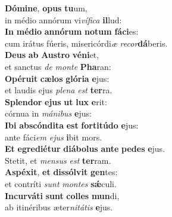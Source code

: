 \evenverse \textbf{Dó}\textbf{mi}\textbf{ne}, \textbf{o}\textbf{pus} \textbf{tu}um,~\*\\
\evenverse in médio annórum vi\textit{ví}\textit{fi}\textit{ca} \textbf{il}lud:\\
\oddverse \textbf{In} \textbf{mé}\textbf{di}\textbf{o} \textbf{an}\textbf{nó}\textbf{rum} \textbf{no}\textbf{tum} \textbf{fá}\textbf{ci}es:~\*\\
\oddverse cum irátus fúeris, misericórdi\textit{æ} \textit{re}\textit{cor}\textbf{dá}beris.\\
\evenverse \textbf{De}\textbf{us} \textbf{ab} \textbf{Au}\textbf{stro} \textbf{vé}\textbf{ni}et,~\*\\
\evenverse et sanctus \textit{de} \textit{mon}\textit{te} \textbf{Pha}ran:\\
\oddverse \textbf{O}\textbf{pé}\textbf{ru}\textbf{it} \textbf{cæ}\textbf{los} \textbf{gló}\textbf{ri}\textbf{a} \textbf{e}jus:~\*\\
\oddverse et laudis ejus \textit{ple}\textit{na} \textit{est} \textbf{ter}ra.\\
\evenverse \textbf{Splen}\textbf{dor} \textbf{e}\textbf{jus} \textbf{ut} \textbf{lux} \textbf{e}rit:~\*\\
\evenverse córnua in \textit{má}\textit{ni}\textit{bus} \textbf{e}jus:\\
\oddverse \textbf{I}\textbf{bi} \textbf{ab}\textbf{scón}\textbf{di}\textbf{ta} \textbf{est} \textbf{for}\textbf{ti}\textbf{tú}\textbf{do} \textbf{e}jus:~\*\\
\oddverse ante fáci\textit{em} \textit{e}\textit{jus} \textbf{i}bit mors.\\
\evenverse \textbf{Et} \textbf{e}\textbf{gre}\textbf{di}\textbf{é}\textbf{tur} \textbf{di}\textbf{á}\textbf{bo}\textbf{lus} \textbf{an}\textbf{te} \textbf{pe}\textbf{des} \textbf{e}jus.~\*\\
\evenverse Stetit, et \textit{men}\textit{sus} \textit{est} \textbf{ter}ram.\\
\oddverse \textbf{A}\textbf{spé}\textbf{xit}, \textbf{et} \textbf{dis}\textbf{sól}\textbf{vit} \textbf{gen}tes:~\*\\
\oddverse et contríti \textit{sunt} \textit{mon}\textit{tes} \textbf{sǽ}culi.\\
\evenverse \textbf{In}\textbf{cur}\textbf{vá}\textbf{ti} \textbf{sunt} \textbf{col}\textbf{les} \textbf{mun}di,~\*\\
\evenverse ab itinéribus æter\textit{ni}\textit{tá}\textit{tis} \textbf{e}jus.\\
